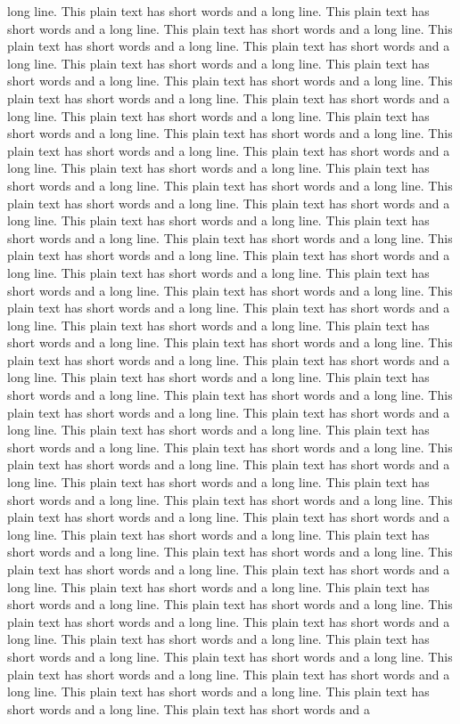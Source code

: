 \documentclass[11pt]{article}
\begin{document}
long line. This plain text has short words and a long line. This plain text has short words and a long line. This plain text has short words and a long line. This plain text has short words and a long line. This plain text has short words and a long line. This plain text has short words and a long line. This plain text has short words and a long line. This plain text has short words and a long line. This plain text has short words and a long line. This plain text has short words and a long line. This plain text has short words and a long line. This plain text has short words and a long line. This plain text has short words and a long line. This plain text has short words and a long line. This plain text has short words and a long line. This plain text has short words and a long line. This plain text has short words and a long line. This plain text has short words and a long line. This plain text has short words and a long line. This plain text has short words and a long line. This plain text has short words and a long line. This plain text has short words and a long line. This plain text has short words and a long line. This plain text has short words and a long line. This plain text has short words and a long line. This plain text has short words and a long line. This plain text has short words and a long line. This plain text has short words and a long line. This plain text has short words and a long line. This plain text has short words and a long line. This plain text has short words and a long line. This plain text has short words and a long line. This plain text has short words and a long line. This plain text has short words and a long line. This plain text has short words and a long line. This plain text has short words and a long line. This plain text has short words and a long line. This plain text has short words and a long line. This plain text has short words and a long line. This plain text has short words and a long line. This plain text has short words and a long line. This plain text has short words and a long line. This plain text has short words and a long line. This plain text has short words and a long line. This plain text has short words and a long line. This plain text has short words and a long line. This plain text has short words and a long line. This plain text has short words and a long line. This plain text has short words and a long line. This plain text has short words and a long line. This plain text has short words and a long line. This plain text has short words and a long line. This plain text has short words and a long line. This plain text has short words and a long line. This plain text has short words and a long line. This plain text has short words and a long line. This plain text has short words and a long line. This plain text has short words and a long line. This plain text has short words and a long line. This plain text has short words and a long line. This plain text has short words and a long line. This plain text has short words and a long line. This plain text has short words and a long line. This plain text has short words and a long line. This plain text has short words and a long line. This plain text has short words and a long line. This plain text has short words and a long line. This plain text has short words and a 
\end{document}

